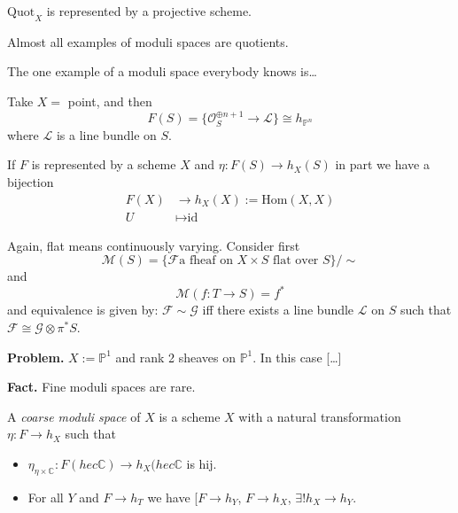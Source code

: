 \begin{theorem}
\label{theorem-Quot-is-represented}
$\text{Quot}_X$ is represented by a projective scheme.
\end{theorem}

Almost all examples of moduli spaces are quotients.

\medskip\noindent

The one example of a moduli space everybody knows is…

\begin{example}
\label{example-projective-space-is-a-quotient}
Take $X=$ point, and then
$$
F(S)=\{\mathcal{O}_S^{\oplus n+1}\to \mathcal{L}\}\cong h_{\mathbb{P}^n}
$$
where $\mathcal{L}$ is a line bundle on $S$.
\end{example}

\begin{definition}
\label{definition-universal-family}
If $F$ is represented by a scheme $X$ and $\eta:F(S)\to h_X(S)$ in part we have
a bijection
\begin{align*}
F(X) &\longrightarrow h_X(X):=\text{Hom}(X,X) \\
U &\longmapsto \text{id}
\end{align*}
\end{definition}

\bigskip\noindent

Again, flat means continuously varying. Consider first
$$
\mathcal{M}(S)=\{\mathcal{F}\text{a fheaf on $X\times S$ flat over }S\}/\sim
$$
and
$$
\mathcal{M}(f:T \to S)=f^*
$$
and equivalence is given by: $\mathcal{F}\sim \mathcal{G}$ iff there exists a
line bundle $\mathcal{L}$ on $S$ such that 
$\mathcal{F}\cong \mathcal{G}\otimes\pi^*S$.

{\bf Problem.} $X:=\mathbb{P}^1$ and rank 2 sheaves on $\mathbb{P}^1$. In this
case […]

{\bf Fact.} Fine moduli spaces are rare.

\begin{definition}
\label{definition-coarse-moduli-space}
A {\it coarse moduli space} of  $X$ is a scheme $X$ with a natural
transformation $\eta:F \to h_X$ such that
\begin{itemize}
\item $\eta_{\eta \times \mathbb{C}}:F(hec \mathbb{C}) \to h_X(hec \mathbb{C}$
is hij.
\item For all $Y$ and $F \to h_T$ we have [$F \to h_Y$, $F\to h_X$, $\exists !
h_X \to h_Y$.
\end{itemize}
\end{definition}

